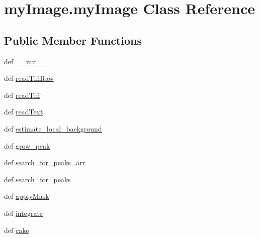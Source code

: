 \hypertarget{classmy_image_1_1my_image}{\section{my\-Image.\-my\-Image Class Reference}
\label{classmy_image_1_1my_image}
}
\subsection*{Public Member Functions}
\begin{DoxyCompactItemize}
\item 
def \hyperlink{classmy_image_1_1my_image_a204047031d17ac62cf6dc595185d4b32}{\-\_\-\-\_\-init\-\_\-\-\_\-}
\item 
def \hyperlink{classmy_image_1_1my_image_ad204cb41e7063c2c059be7edcb869fde}{read\-Tiff\-Raw}
\item 
def \hyperlink{classmy_image_1_1my_image_a9b2b7ca12028fc3c486ba1596986d200}{read\-Tiff}
\item 
def \hyperlink{classmy_image_1_1my_image_abf9d2037186dd54cfc3f98d3a14ec7b2}{read\-Text}
\item 
def \hyperlink{classmy_image_1_1my_image_a288af89bccb1aeb479746201f5f349e0}{estimate\-\_\-local\-\_\-background}
\item 
def \hyperlink{classmy_image_1_1my_image_a7d27a9c7a1708eedb66c5d2df6d83793}{grow\-\_\-peak}
\item 
def \hyperlink{classmy_image_1_1my_image_a50a355a2d27f7f62347eb2ecda76cc7f}{search\-\_\-for\-\_\-peaks\-\_\-arr}
\item 
def \hyperlink{classmy_image_1_1my_image_a947569b9e4f7e027e178961c8593e56d}{search\-\_\-for\-\_\-peaks}
\item 
def \hyperlink{classmy_image_1_1my_image_ac7d39571b3e508c285ea29391e81d83d}{apply\-Mask}
\item 
def \hyperlink{classmy_image_1_1my_image_a6d3a40f22167549a6c6d68d61c34fe88}{integrate}
\item 
def \hyperlink{classmy_image_1_1my_image_a7f239b15b61b6564c51b279b337c04a6}{cake}
\end{DoxyCompactItemize}
